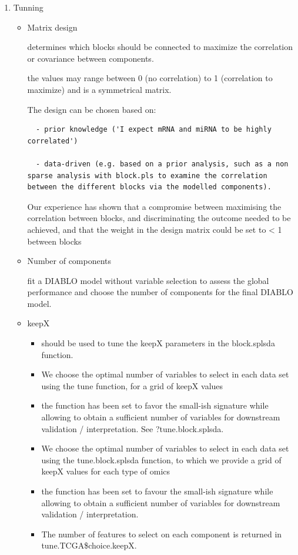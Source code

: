 \documentclass[
]{book}
\begin{document}
\begin{enumerate}
\def\labelenumi{\arabic{enumi})}
\setcounter{enumi}{1}
\item
  Tunning

  \begin{itemize}
  \item
    Matrix design

    determines which blocks should be connected to maximize the correlation or covariance between components.

    the values may range between 0 (no correlation) to 1 (correlation to maximize) and is a symmetrical matrix.

    The design can be chosen based on:

\begin{verbatim}
  - prior knowledge ('I expect mRNA and miRNA to be highly correlated')

  - data-driven (e.g. based on a prior analysis, such as a non sparse analysis with block.pls to examine the correlation between the different blocks via the modelled components).
\end{verbatim}

    Our experience has shown that a compromise between maximising the correlation between blocks, and discriminating the outcome needed to be achieved, and that the weight in the design matrix could be set to \textless{} 1 between blocks
  \item
    Number of components

    fit a DIABLO model without variable selection to assess the global performance and choose the number of components for the final DIABLO model.
  \item
    keepX

    \begin{itemize}
    \item
      should be used to tune the keepX parameters in the block.splsda function.
    \item
      We choose the optimal number of variables to select in each data set using the tune function, for a grid of keepX values
    \item
      the function has been set to favor the small-ish signature while allowing to obtain a sufficient number of variables for downstream validation / interpretation. See ?tune.block.splsda.
    \item
      We choose the optimal number of variables to select in each data set using the tune.block.splsda function, to which we provide a grid of keepX values for each type of omics
    \item
      the function has been set to favour the small-ish signature while allowing to obtain a sufficient number of variables for downstream validation / interpretation.
    \item
      The number of features to select on each component is returned in tune.TCGA\$choice.keepX.


\end{itemize}
\end{itemize}
\end{enumerate}
\end{document}
